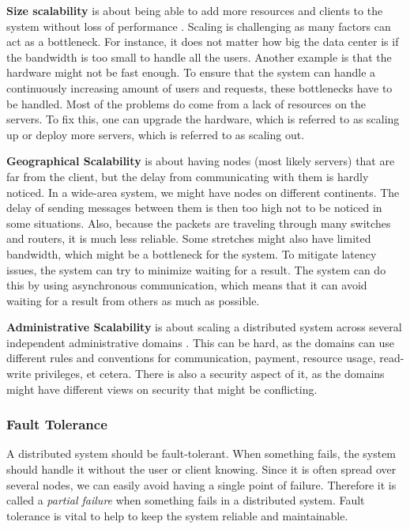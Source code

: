 \textbf{Size scalability} is about being able to add more resources and clients to the system without loss of performance \cite{steen_distributed_2017}. Scaling is challenging as many factors can act as a bottleneck. For instance, it does not matter how big the data center is if the bandwidth is too small to handle all the users. Another example is that the hardware might not be fast enough. To ensure that the system can handle a continuously increasing amount of users and requests, these bottlenecks have to be handled. Most of the problems do come from a lack of resources on the servers. To fix this, one can upgrade the hardware, which is referred to as scaling up or deploy more servers, which is referred to as scaling out.

\textbf{Geographical Scalability} is about having nodes (most likely servers) that are far from the client, but the delay from communicating with them is hardly noticed. In a wide-area system, we might have nodes on different continents. The delay of sending messages between them is then too high not to be noticed in some situations. Also, because the packets are traveling through many switches and routers, it is much less reliable. Some stretches might also have limited bandwidth, which might be a bottleneck for the system. To mitigate latency issues, the system can try to minimize waiting for a result. The system can do this by using asynchronous communication, which means that it can avoid waiting for a result from others as much as possible.

\textbf{Administrative Scalability} is about scaling a distributed system across several independent administrative domains \cite{steen_distributed_2017}. This can be hard, as the domains can use different rules and conventions for communication, payment, resource usage, read-write privileges, et cetera. There is also a security aspect of it, as the domains might have different views on security that might be conflicting. 


\subsubsection{Fault Tolerance}
A distributed system should be fault-tolerant. When something fails, the system should handle it without the user or client knowing. Since it is often spread over several nodes, we can easily avoid having a single point of failure. Therefore it is called a \textit{partial failure}\cite{steen_distributed_2017} when something fails in a distributed system. Fault tolerance is vital to help to keep the system reliable and maintainable. 

